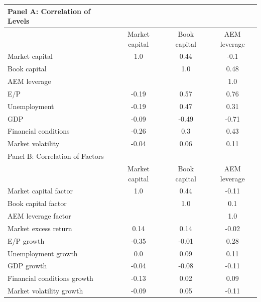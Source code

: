 \documentclass{article}
\begin{document}
    \begin{table}[htbp]
    \centering
    \begin{adjustbox}{max width=\textwidth}
    \small
    \begin{tabular}{lccc}
        \toprule
        Panel A: Correlation of Levels \\
        \midrule
         & Market capital & Book capital & AEM leverage \\
        \midrule
        Market capital & 1.0 & 0.44 & -0.1 \\
Book capital &  & 1.0 & 0.48 \\
AEM leverage &  &  & 1.0 \\
E/P & -0.19 & 0.57 & 0.76 \\
Unemployment & -0.19 & 0.47 & 0.31 \\
GDP & -0.09 & -0.49 & -0.71 \\
Financial conditions & -0.26 & 0.3 & 0.43 \\
Market volatility & -0.04 & 0.06 & 0.11 \\
        \midrule
        Panel B: Correlation of Factors \\
        \midrule
         & Market capital & Book capital & AEM leverage \\
        \midrule
        Market capital factor & 1.0 & 0.44 & -0.11 \\
Book capital factor &  & 1.0 & 0.1 \\
AEM leverage factor &  &  & 1.0 \\
Market excess return & 0.14 & 0.14 & -0.02 \\
E/P growth & -0.35 & -0.01 & 0.28 \\
Unemployment growth & 0.0 & 0.09 & 0.11 \\
GDP growth & -0.04 & -0.08 & -0.11 \\
Financial conditions growth & -0.13 & 0.02 & 0.09 \\
Market volatility growth & -0.09 & 0.05 & -0.11 \\
        \bottomrule
    \end{tabular}
    \end{adjustbox}
    \end{table}
    
\end{document}
